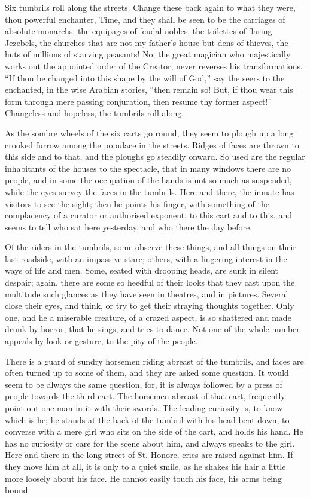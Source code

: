 Six tumbrils roll along the streets.  Change these back again to what
they were, thou powerful enchanter, Time, and they shall be seen to
be the carriages of absolute monarchs, the equipages of feudal nobles,
the toilettes of flaring Jezebels, the churches that are not my
father's house but dens of thieves, the huts of millions of starving
peasants!  No; the great magician who majestically works out the
appointed order of the Creator, never reverses his transformations.
``If thou be changed into this shape by the will of God,'' say the
seers to the enchanted, in the wise Arabian stories, ``then remain so!
But, if thou wear this form through mere passing conjuration, then resume
thy former aspect!''  Changeless and hopeless, the tumbrils roll along.

As the sombre wheels of the six carts go round, they seem to plough
up a long crooked furrow among the populace in the streets.  Ridges
of faces are thrown to this side and to that, and the ploughs go
steadily onward.  So used are the regular inhabitants of the houses
to the spectacle, that in many windows there are no people,
and in some the occupation of the hands is not so much as suspended,
while the eyes survey the faces in the tumbrils.  Here and there,
the inmate has visitors to see the sight; then he points his finger,
with something of the complacency of a curator or authorised exponent,
to this cart and to this, and seems to tell who sat here yesterday,
and who there the day before.

Of the riders in the tumbrils, some observe these things, and all
things on their last roadside, with an impassive stare; others, with
a lingering interest in the ways of life and men.  Some, seated with
drooping heads, are sunk in silent despair; again, there are some so
heedful of their looks that they cast upon the multitude such glances
as they have seen in theatres, and in pictures.  Several close their
eyes, and think, or try to get their straying thoughts together.
Only one, and he a miserable creature, of a crazed aspect, is so
shattered and made drunk by horror, that he sings, and tries to
dance.  Not one of the whole number appeals by look or gesture, to
the pity of the people.

There is a guard of sundry horsemen riding abreast of the tumbrils,
and faces are often turned up to some of them, and they are asked
some question.  It would seem to be always the same question, for,
it is always followed by a press of people towards the third cart.
The horsemen abreast of that cart, frequently point out one man in it
with their swords. The leading curiosity is, to know which is he;
he stands at the back of the tumbril with his head bent down,
to converse with a mere girl who sits on the side of the cart,
and holds his hand.  He has no curiosity or care for the scene about him,
and always speaks to the girl.  Here and there in the long street
of St. Honore, cries are raised against him.  If they move him at all,
it is only to a quiet smile, as he shakes his hair a little more
loosely about his face.  He cannot easily touch his face, his arms
being bound.


